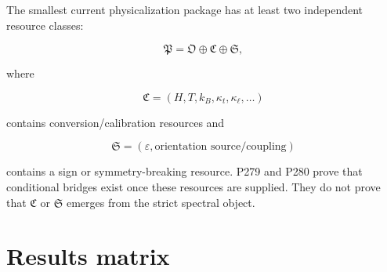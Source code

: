 \documentclass[11pt,a4paper,openany]{report}
\begin{document}
The smallest current physicalization package has at least two independent resource classes:

\[
\mathfrak P
=
\mathfrak O
\oplus
\mathfrak C
\oplus
\mathfrak S,
\]

where

\[
\mathfrak C=(H,T,k_B,\kappa_t,\kappa_\ell,\ldots)
\]

contains conversion/\allowbreak{}calibration resources and

\[
\mathfrak S=(\varepsilon,\text{orientation source/coupling})
\]

contains a sign or symmetry-breaking resource. P279 and P280 prove that conditional bridges exist once these resources are supplied. They do not prove that \(\mathfrak C\) or \(\mathfrak S\) emerges from the strict spectral object.

\chapter{Results matrix}
\end{document}
